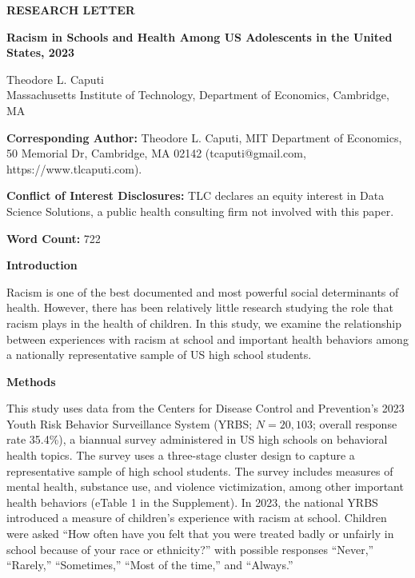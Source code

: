 \documentclass[12pt]{article}
\begin{document}
\raggedright

\thispagestyle{empty}

\noindent\textbf{RESEARCH LETTER}

\vspace{24pt}

\noindent\textbf{Racism in Schools and Health Among US Adolescents in the United States, 2023}

\vspace{24pt}

\noindent Theodore L. Caputi\\
Massachusetts Institute of Technology, Department of Economics, Cambridge, MA

\vspace{24pt}

\noindent\textbf{Corresponding Author:} Theodore L. Caputi, MIT Department of Economics,
50 Memorial Dr, Cambridge, MA 02142 (tcaputi@gmail.com, https://www.tlcaputi.com).

\vspace{12pt}

\noindent\textbf{Conflict of Interest Disclosures:} TLC declares an equity
interest in Data Science Solutions, a public health consulting firm not
involved with this paper.

\vspace{12pt}

\noindent\textbf{Word Count:} 722

\clearpage

\noindent\textbf{Introduction}

Racism is one of the best documented and most powerful social determinants of
health.\cite{williams2013racism,paradies2015racism} However, there has been relatively little research studying the role
that racism plays in the health of children.\cite{priest2013racism} In this study, we examine the
relationship between experiences with racism at school and important health behaviors
among a nationally representative sample of US high school students.

\vspace{6pt}

\noindent\textbf{Methods}

This study uses data from the Centers for Disease Control and Prevention's 2023
Youth Risk Behavior Surveillance System (YRBS; $N = 20,103$; overall response rate
35.4\%), a biannual survey administered in US high schools on behavioral health
topics.\cite{cdc2023yrbs} The survey uses a three-stage cluster design to capture a representative
sample of high school students. The survey includes measures of mental health, substance
use, and violence victimization, among other important health behaviors (eTable 1 in the
Supplement). In 2023, the national YRBS introduced a measure of children's experience
with racism at school. Children were asked ``How often have you felt that you were treated
badly or unfairly in school because of your race or ethnicity?'' with possible responses
``Never,'' ``Rarely,'' ``Sometimes,'' ``Most of the time,'' and ``Always.''
\end{document}
